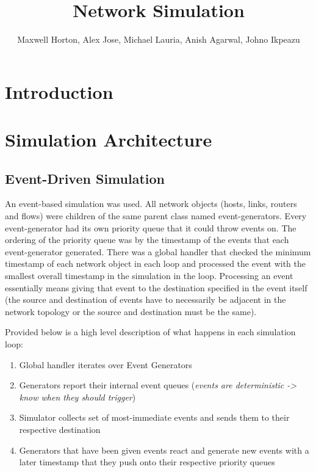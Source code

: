 \documentclass[12pt]{article}
\begin{document}
\title{Network Simulation}
\author{Maxwell Horton, Alex Jose, Michael Lauria, Anish Agarwal, Johno Ikpeazu}


\maketitle
\noindent
\tableofcontents
\newpage
\section{Introduction}



\section{Simulation Architecture}

\subsection{Event-Driven Simulation}
An event-based simulation was used. All network objects (hosts, links, routers and flows) were children of the same parent class named event-generators. Every event-generator had its own priority queue that it could throw events on. The ordering of the priority queue was by the timestamp of the events that each event-generator generated. There was a global handler that checked the minimum timestamp of each network object in each loop and processed the event with the smallest overall timestamp in the simulation in the loop. Processing an event essentially means giving that event to the destination specified in the event itself (the source and destination of events have to necessarily be adjacent in the network topology or the source and destination must be the same). 

Provided below is a high level description of what happens in each simulation loop:
\begin{enumerate}
\item Global handler iterates over Event Generators
\item Generators report their internal event queues (\emph{events are deterministic -> know when they should trigger})
\item Simulator collects set of most-immediate events and sends them to their respective destination
\item Generators that have been given events react and generate new events with a later timestamp that they push onto their respective priority queues
\end{enumerate}
\end{document}
